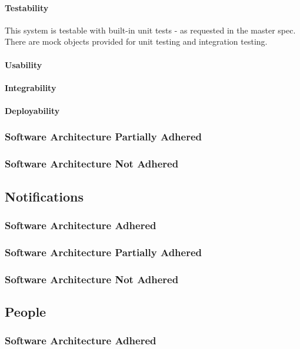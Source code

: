 \documentclass{article}
\begin{document}
            \paragraph{Testability}
            This system is testable with built-in unit tests - as requested in the master spec. There are mock objects provided for unit testing and integration testing.
            \paragraph{Usability}
            \paragraph{Integrability}
            \paragraph{Deployability}
        \subsubsection{Software Architecture Partially Adhered}
        \subsubsection{Software Architecture Not Adhered}       
        
    \subsection{Notifications}
        \subsubsection{Software Architecture Adhered}
        \subsubsection{Software Architecture Partially Adhered}
        \subsubsection{Software Architecture Not Adhered}       
        
    \subsection{People}
        \subsubsection{Software Architecture Adhered}
\end{document}
